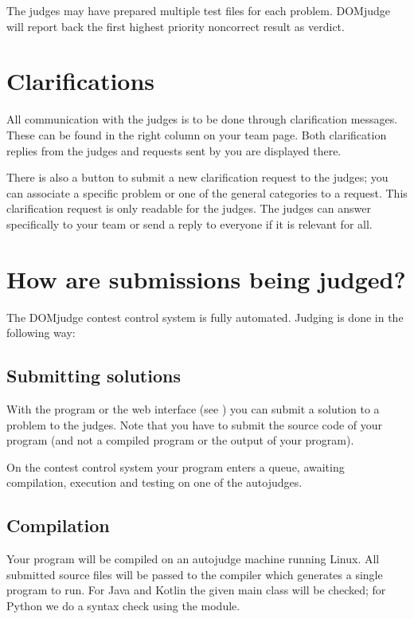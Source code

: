 \documentclass[a4paper,10pt,english,openany]{sphinxmanual}
\begin{document}
\sphinxAtStartPar
The judges may have prepared multiple test files for each problem.
DOMjudge will report back the first highest priority non\sphinxhyphen{}correct result as verdict.


\section{Clarifications}
\label{\detokenize{team:clarifications}}
\sphinxAtStartPar
All communication with the judges is to be done through clarification
messages.
These can be found in the right column on your team page. Both
clarification replies from the judges and requests sent by you
are displayed there.

\sphinxAtStartPar
There is also a button to submit a new clarification request to the
judges; you can associate a specific problem or one of the general
categories to a request. This clarification request is only readable
for the judges. The judges can answer specifically to your team or send a
reply to everyone if it is relevant for all.


\section{How are submissions being judged?}
\label{\detokenize{team:how-are-submissions-being-judged}}\label{\detokenize{team:judgingprocess}}
\sphinxAtStartPar
The DOMjudge contest control system is fully automated.
Judging is done in the following way:


\subsection{Submitting solutions}
\label{\detokenize{team:id1}}
\sphinxAtStartPar
With the  program or the web interface (see
{\hyperref[\detokenize{team:submitting}]{}}) you
can submit a solution to a problem to the judges. Note that you have to submit
the source code of your program (and not a compiled program or the output of
your program).

\sphinxAtStartPar
On the contest control system your program enters a queue, awaiting compilation,
execution and testing on one of the autojudges.


\subsection{Compilation}
\label{\detokenize{team:compilation}}
\sphinxAtStartPar
Your program will be compiled on an autojudge machine running Linux.
All submitted source files will be passed to the compiler which
generates a single program to run. For Java and Kotlin the given
main class will be checked; for Python we do a
syntax check using the  module.
\end{document}
